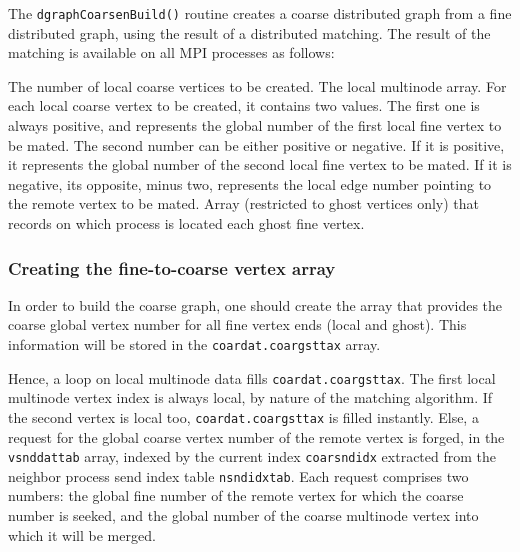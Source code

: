 The \texttt{dgraphCoarsenBuild()} routine creates a coarse distributed
graph from a fine distributed graph, using the result of a distributed
matching. The result of the matching is available on all MPI processes
as follows:
\begin{itemize}
  The number of local coarse vertices to be created.
  The local multinode array. For each local coarse vertex to be
  created, it contains two values. The first one is always positive,
  and represents the global number of the first local fine vertex to
  be mated. The second number can be either positive or negative. If
  it is positive, it represents the global number of the second local
  fine vertex to be mated. If it is negative, its opposite, minus two,
  represents the local edge number pointing to the remote vertex to be
  mated.
  Array (restricted to ghost vertices only) that records on which
  process is located each ghost fine vertex.
\end{itemize}

\subsubsection{Creating the fine-to-coarse vertex array}

In order to build the coarse graph, one should create the array that
provides the coarse global vertex number for all fine vertex ends
(local and ghost). This information will be stored in the
\texttt{coardat.\lbt coargsttax} array.

Hence, a loop on local multinode data fills
\texttt{coardat.\lbt coargsttax}. The first local multinode vertex
index is always local, by nature of the matching algorithm.
If the second vertex is local too, \texttt{coardat.\lbt coargsttax} is
filled instantly. Else, a request for the global coarse vertex number
of the remote vertex is forged, in the \texttt{vsnddattab} array,
indexed by the current index \texttt{coarsndidx} extracted from the
neighbor process send index table \texttt{nsndidxtab}. Each request
comprises two numbers: the global fine number of the remote vertex for
which the coarse number is seeked, and the global number of the
coarse multinode vertex into which it will be merged.

